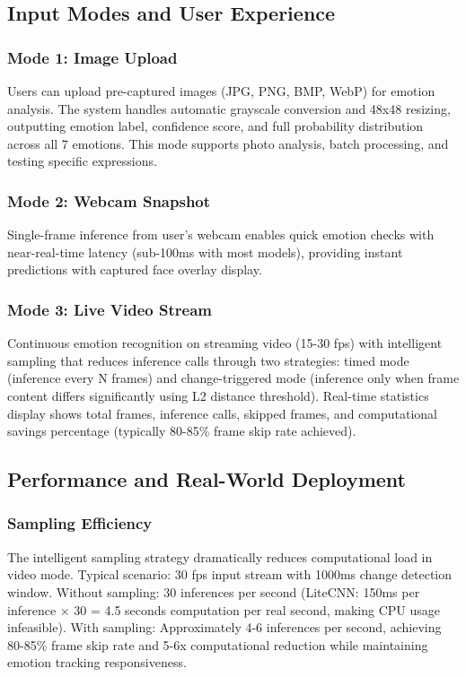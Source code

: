 \documentclass[12pt,a4paper]{article}
\begin{document}
\subsection{Input Modes and User Experience}

\subsubsection{Mode 1: Image Upload}
Users can upload pre-captured images (JPG, PNG, BMP, WebP) for emotion analysis. The system handles automatic grayscale conversion and 48x48 resizing, outputting emotion label, confidence score, and full probability distribution across all 7 emotions. This mode supports photo analysis, batch processing, and testing specific expressions.

\subsubsection{Mode 2: Webcam Snapshot}
Single-frame inference from user's webcam enables quick emotion checks with near-real-time latency (sub-100ms with most models), providing instant predictions with captured face overlay display.

\subsubsection{Mode 3: Live Video Stream}
Continuous emotion recognition on streaming video (15-30 fps) with intelligent sampling that reduces inference calls through two strategies: timed mode (inference every N frames) and change-triggered mode (inference only when frame content differs significantly using L2 distance threshold). Real-time statistics display shows total frames, inference calls, skipped frames, and computational savings percentage (typically 80-85\% frame skip rate achieved).

\subsection{Performance and Real-World Deployment}

\subsubsection{Sampling Efficiency}
The intelligent sampling strategy dramatically reduces computational load in video mode. Typical scenario: 30 fps input stream with 1000ms change detection window. Without sampling: 30 inferences per second (LiteCNN: 150ms per inference × 30 = 4.5 seconds computation per real second, making CPU usage infeasible). With sampling: Approximately 4-6 inferences per second, achieving 80-85\% frame skip rate and 5-6x computational reduction while maintaining emotion tracking responsiveness.
\end{document}
